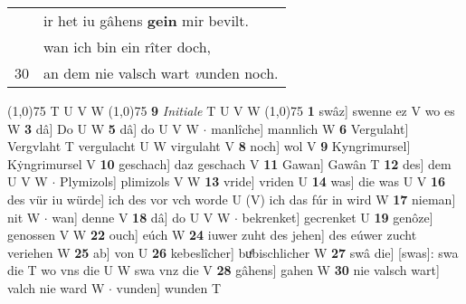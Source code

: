 \documentclass[8pt,a4paper,notitlepage]{article}
\begin{document}
\begin{table}[ht]
\begin{minipage}[t]{0.5\linewidth}
\begin{tabular}{rl}
 & ir het iu gâhens \textbf{gein} mir bevilt.\\ 
 & wan ich bin ein rîter doch,\\ 
30 & an dem nie valsch wart \textit{v}unden noch.\\ 
\end{tabular}
\scriptsize
\line(1,0){75} \newline
T U V W \newline
\line(1,0){75} \newline
\textbf{9} \textit{Initiale} T U V W  \newline
\line(1,0){75} \newline
\textbf{1} swâz] swenne ez V wo es W \textbf{3} dâ] Do U W \textbf{5} dâ] do U V W  $\cdot$ manlîche] mannlich W \textbf{6} Vergulaht] Vergvlaht T vergulacht U W virgulaht V \textbf{8} noch] wol V \textbf{9} Kyngrimursel] Kẏngrimursel V \textbf{10} geschach] daz geschach V \textbf{11} Gawan] Gawân T \textbf{12} des] dem U V W  $\cdot$ Plymizols] plimizols V W \textbf{13} vride] vriden U \textbf{14} was] die was U V \textbf{16} des vür iu würde] ich des vor vch worde U (V) ich das fúr in wird W \textbf{17} nieman] nit W  $\cdot$ wan] denne V \textbf{18} dâ] do U V W  $\cdot$ bekrenket] gecrenket U \textbf{19} genôze] genossen V W \textbf{22} ouch] eúch W \textbf{24} iuwer zuht des jehen] des eúwer zucht veriehen W \textbf{25} ab] von U \textbf{26} kebeslîcher] buͤbischlicher W \textbf{27} swâ die] [swas]: swa die T wo vns die U W swa vnz die V \textbf{28} gâhens] gahen W \textbf{30} nie valsch wart] valch nie ward W  $\cdot$ vunden] wunden T \newline
\end{minipage}
\end{table}
\end{document}
